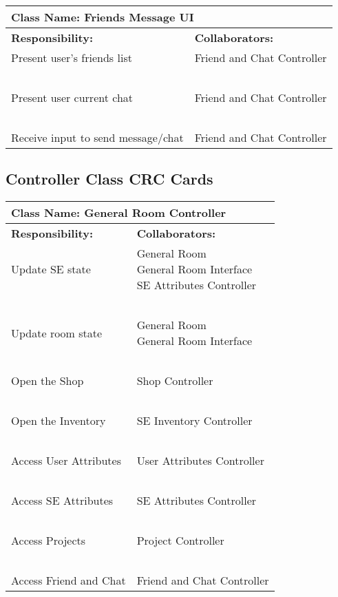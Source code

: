 \documentclass[]{article}
\begin{document}
\begin{table}[H]
    \centering
    \begin{tabular}{|p{7.5cm}|p{7.5cm}|}
        \hline
        \multicolumn{2}{|l|}{\textbf{Class Name:} Friends Message UI}\\
        \hline
        \textbf{Responsibility:} & \textbf{Collaborators:}\\
        \hline
        Present user’s friends list & Friend and Chat Controller\\
        ~ & ~\\
        Present user current chat & Friend and Chat Controller\\
        ~ & ~\\
        Receive input to send message/chat & Friend and Chat Controller\\
        \hline
    \end{tabular}
\end{table}

\subsection{Controller Class CRC Cards}
\label{sec:controller_class_CRC_cards}

\begin{table}[H]
    \centering
    \begin{tabular}{|p{7.5cm}|p{7.5cm}|}
        \hline
        \multicolumn{2}{|l|}{\textbf{Class Name:} General Room Controller}\\
        \hline
        \textbf{Responsibility:} & \textbf{Collaborators:}\\
        \hline
        Update SE state & \makecell[l]{General Room \\ General Room Interface \\ SE Attributes Controller}\\
        ~ & ~\\
        Update room state & \makecell[l]{General Room \\ General Room Interface}\\
        ~ & ~\\
        Open the Shop & Shop Controller\\
        ~ & ~\\
        Open the Inventory & SE Inventory Controller\\
        ~ & ~\\
        Access User Attributes & User Attributes Controller\\
        ~ & ~\\
        Access SE Attributes & SE Attributes Controller\\
        ~ & ~\\
        Access Projects & Project Controller\\
        ~ & ~\\
        Access Friend and Chat & Friend and Chat Controller\\
        \hline
    \end{tabular}
\end{table}
\end{document}
